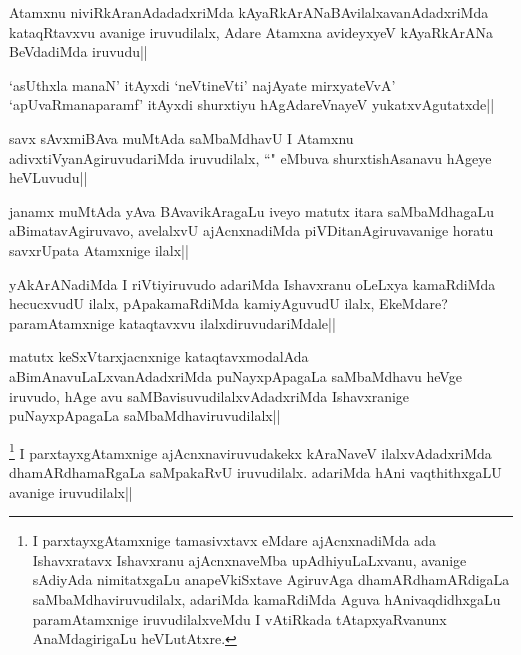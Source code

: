 
\begin{artha}
Atamxnu niviRkAranAdadadxriMda kAyaRkArANaBAvilalxavanAdadxriMda kataqRtavxvu avanige iruvudilalx, Adare Atamxna avideyxyeV kAyaRkArANa BeVdadiMda iruvudu||
\end{artha}


\begin{artha}
`asUthxla manaN' itAyxdi `neVtineVti' najAyate mirxyateVvA' `apUvaRmanaparamf' itAyxdi shurxtiyu hAgAdareVnayeV yukatxvAgutatxde||
\end{artha}

\begin{artha}
savx sAvxmiBAva muMtAda saMbaMdhavU  I Atamxnu adivxtiVyanAgiruvudariMda iruvudilalx, ``\stext" eMbuva shurxtishAsanavu hAgeye heVLuvudu||
\end{artha}

\begin{artha}
janamx muMtAda yAva BAvavikAragaLu iveyo matutx itara saMbaMdhagaLu aBimatavAgiruvavo, avelalxvU ajAcnxnadiMda piVDitanAgiruvavanige horatu savxrUpata Atamxnige ilalx||
\end{artha}

\begin{artha}
yAkArANadiMda I riVtiyiruvudo adariMda Ishavxranu oLeLxya kamaRdiMda hecucxvudU ilalx, pApakamaRdiMda kamiyAguvudU ilalx, EkeMdare? paramAtamxnige kataqtavxvu ilalxdiruvudariMdale||
\end{artha}

\begin{artha}
matutx keSxVtarxjacnxnige kataqtavxmodalAda aBimAnavuLaLxvanAdadxriMda puNayxpApagaLa saMbaMdhavu heVge iruvudo, hAge avu saMBavisuvudilalxvAdadxriMda Ishavxranige puNayxpApagaLa saMbaMdhaviruvudilalx||
\end{artha}


\begin{artha}
\footnote{I parxtayxgAtamxnige tamasivxtavx eMdare ajAcnxnadiMda ada Ishavxratavx Ishavxranu ajAcnxnaveMba upAdhiyuLaLxvanu, avanige sAdiyAda nimitatxgaLu anapeVkiSxtave AgiruvAga dhamARdhamARdigaLa saMbaMdhaviruvudilalx, adariMda kamaRdiMda Aguva hAnivaqdidhxgaLu paramAtamxnige iruvudilalxveMdu I vAtiRkada tAtapxyaRvanunx AnaMdagirigaLu heVLutAtxre.} I parxtayxgAtamxnige ajAcnxnaviruvudakekx kAraNaveV ilalxvAdadxriMda dhamARdhamaRgaLa saMpakaRvU iruvudilalx. adariMda hAni vaqthithxgaLU avanige iruvudilalx||
\end{artha}

